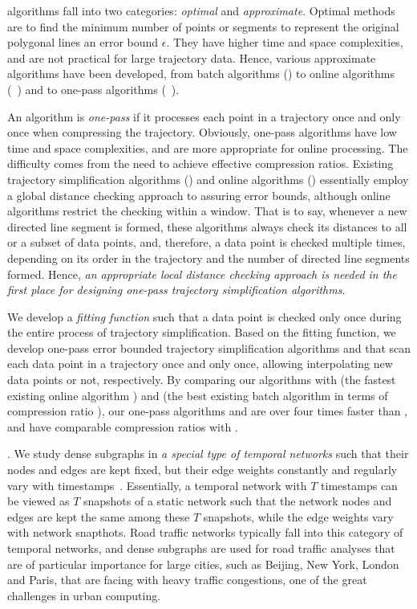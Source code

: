 \lsa algorithms fall into two categories: {\em optimal} and {\em approximate}.
Optimal methods\cite{Imai:Optimal} are to find the minimum number of points or segments to represent the original polygonal lines \wrt an error bound $\epsilon$. They have higher time and space complexities, and are not practical for large trajectory data.
Hence,  various approximate \lsa algorithms have been developed, from batch algorithms (\eg \cite{Douglas:Peucker}) to online algorithms (\eg~\cite{Liu:BQS}) and to one-pass algorithms (\eg~\cite{LinMZWH17}).


An \lsa algorithm is {\em one-pass} if it processes each point in a trajectory once and only once when compressing the trajectory.
Obviously, one-pass algorithms have low time and space complexities, and are more appropriate for online processing. The difficulty comes from the need to achieve effective compression ratios.
Existing trajectory simplification algorithms (\eg \cite{Douglas:Peucker}) and online algorithms  (\eg \cite{Liu:BQS}) essentially employ a global distance checking approach to assuring error bounds, although online algorithms restrict the checking within a window. That is to say, whenever a new directed line segment is formed, these algorithms always check its distances to all or a subset of data points, and, therefore, a data point is checked multiple times, depending on its order in the trajectory and the number of directed line segments formed. Hence, {\em an appropriate local distance checking approach is needed in the first place for designing one-pass trajectory simplification algorithms}.

 We develop a  {\em fitting function} such that a data point is checked only once during the entire process of trajectory simplification. Based on the fitting function, we develop one-pass error bounded trajectory simplification algorithms \operb and \operba that scan each data point in a trajectory once and only once, allowing interpolating new data points or not, respectively. By comparing our algorithms with \fbqsa (the fastest existing \lsa online algorithm \cite{Liu:BQS}) and \dpa (the best existing \lsa batch algorithm in terms of compression ratio \cite{Douglas:Peucker}), our one-pass algorithms  \operb and \operba are over four times faster than \fbqsa, and have  comparable compression ratios with \dpa.


.  We study dense subgraphs in {\em a special type of temporal networks} such that their nodes and edges are kept fixed, but their edge weights constantly and regularly vary with timestamps~\cite{MaHWLH17}.  Essentially, a temporal network with $T$ timestamps can be viewed as $T$ snapshots of a static network such that the network nodes and edges are kept the same among these $T$ snapshots, while the edge weights vary with network snapthots. Road traffic networks typically fall into this category of temporal networks, and dense subgraphs are used for road traffic analyses that are of particular importance for large cities, such as Beijing, New York, London and Paris, that are facing with heavy traffic congestions, one of the great challenges in urban computing.

